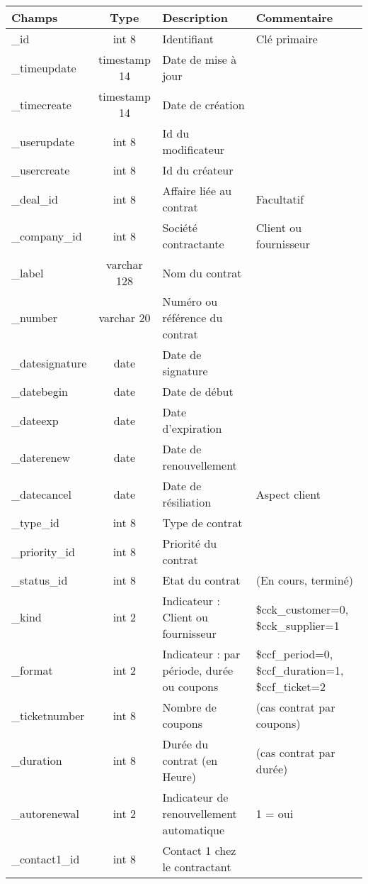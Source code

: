 \begin{tabular}{|p{3cm}|c|p{5.4cm}|p{2.6cm}|}
\hline
\textbf{Champs} & \textbf{Type} & \textbf{Description} & \textbf{Commentaire} \\
\hline
\_id & int 8 & Identifiant & Clé primaire \\
\hline
\_timeupdate & timestamp 14 & Date de mise à jour & \\
\hline
\_timecreate & timestamp 14 & Date de création & \\
\hline
\_userupdate & int 8 & Id du modificateur & \\
\hline
\_usercreate & int 8 & Id du créateur & \\
\hline
\_deal\_id & int 8 & Affaire liée au contrat & Facultatif \\
\hline
\_company\_id & int 8 & Société contractante & Client ou fournisseur \\
\hline
\_label & varchar 128 & Nom du contrat & \\
\hline
\_number & varchar 20 & Numéro ou référence du contrat & \\
\hline
\_datesignature & date & Date de signature & \\
\hline
\_datebegin & date & Date de début & \\
\hline
\_dateexp & date & Date d'expiration & \\
\hline
\_daterenew & date & Date de renouvellement & \\
\hline
\_datecancel & date & Date de résiliation & Aspect client \\
\hline
\_type\_id & int 8 & Type de contrat & \\
\hline
\_priority\_id & int 8 & Priorité du contrat & \\
\hline
\_status\_id & int 8 & Etat du contrat & (En cours, terminé)\\
\hline
\_kind & int 2 & Indicateur : Client ou fournisseur & \$cck\_customer=0, \$cck\_supplier=1\\
\hline
\_format & int 2 & Indicateur : par période, durée ou coupons & \$ccf\_period=0, \$ccf\_duration=1, \$ccf\_ticket=2\\
\hline
\_ticketnumber & int 8 & Nombre de coupons & (cas contrat par coupons)\\
\hline
\_duration & int 8 & Durée du contrat (en Heure) & (cas contrat par durée)\\
\hline
\_autorenewal & int 2 & Indicateur de renouvellement automatique & 1 = oui\\
\hline
\_contact1\_id & int 8 & Contact 1 chez le contractant &\\

\end{tabular}
